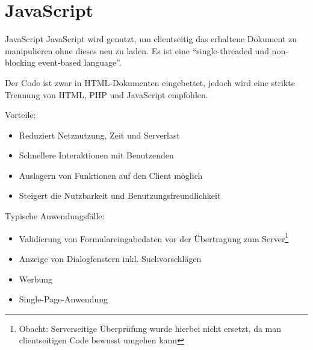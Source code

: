 \section{JavaScript}

\begin{defi}{JavaScript}
    JavaScript wird genutzt, um clientseitig das erhaltene Dokument zu manipulieren ohne dieses neu zu laden.
    Es ist eine \enquote{single-threaded und non-blocking event-based language}.

    Der Code ist zwar in HTML-Dokumenten eingebettet, jedoch wird eine strikte Trennung von HTML, PHP und JavaScript empfohlen.

    Vorteile:
    \begin{itemize}
        \item Reduziert Netznutzung, Zeit und Serverlast
        \item Schnellere Interaktionen mit Benutzenden
        \item Auslagern von Funktionen auf den Client möglich
        \item Steigert die Nutzbarkeit und Benutzungsfreundlichkeit
    \end{itemize}

    Typische Anwendungsfälle:
    \begin{itemize}
        \item Validierung von Formulareingabedaten vor der Übertragung zum Server\footnote{Obacht: Serverseitige Überprüfung wurde hierbei nicht ersetzt, da man clientseitigen Code bewusst umgehen kann}
        \item Anzeige von Dialogfenstern inkl. Suchvorschlägen
        \item Werbung
        \item Single-Page-Anwendung
    \end{itemize}
\end{defi}

